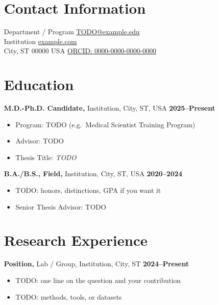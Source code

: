 \begin{resume}

\section{Contact Information}
%
%
Department / Program        \hfill \href{mailto:TODO@example.edu}{TODO@example.edu}\\
Institution                 \hfill \href{https://example.com/}{example.com}\\
City, ST 00000 USA          \hfill \href{https://orcid.org/0000-0000-0000-0000}{ORCID: 0000-0000-0000-0000}

\section{Education}
{\bf M.D.-Ph.D. Candidate,} Institution, City, ST, USA \hfill {\bf 2025--Present}\\
\vspace*{-.1in}
\begin{itemize}
\item[ ] Program: TODO (e.g.\ Medical Scientist Training Program)
\item[ ] Advisor: TODO
\item[ ] Thesis Title: {\it TODO}
\end{itemize}

{\bf B.A./B.S., Field,} Institution, City, ST, USA \hfill {\bf 2020--2024}\\
\vspace*{-.1in}
\begin{itemize}
\item[ ] TODO: honors, distinctions, GPA if you want it
\item[ ] Senior Thesis Advisor: TODO
\end{itemize}

\section{Research Experience}
{\bf Position,} Lab / Group, Institution, City, ST \hfill {\bf 2024--Present}\\
\vspace*{-.1in}
\begin{itemize}
\item[ ] TODO: one line on the question and your contribution
\item[ ] TODO: methods, tools, or datasets
\end{itemize}


\end{resume}
